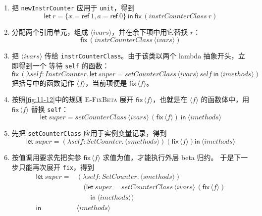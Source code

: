 \begin{enumerate}
\item 把 \texttt{newInstrCounter} 应用于 \texttt{unit}，得到
\[
\mathsf{let}\ r=\{x=\mathsf{ref}\ 1,a=\mathsf{ref}\ 0\}\
\mathsf{in}\ \mathsf{fix}\,(\mathit{instrCounterClass}\ r)
\]

\item 分配两个引用单元，组成
\(\langle\mathit{ivars}\rangle\)，并在余下项中用它替换 \(r\)：
\[
\mathsf{fix}\,(\mathit{instrCounterClass}\,
  \langle\mathit{ivars}\rangle)
\]

\item 把 \(\langle\mathit{ivars}\rangle\) 传给
\texttt{instrCounterClass}。由于该类以两个 lambda 抽象开头，立即得到一个
等待 \texttt{self} 的函数：
\[
\mathsf{fix}\,(\lambda self:\mathit{InstrCounter}.\,
  \mathsf{let}\ super=
    \mathit{setCounterClass}\,\langle\mathit{ivars}\rangle\,self\
  \mathsf{in}\ \langle\mathit{imethods}\rangle)
\]
把括号中的函数记作 \(\langle f\rangle\)，当前项便是
\(\mathsf{fix}\,\langle f\rangle\)。

\item 按照\cref{fig:11-12}中的规则 \textsc{E-FixBeta} 展开
\(\mathsf{fix}\,\langle f\rangle\)，也就是在
\(\langle f\rangle\) 的函数体中，用
\(\mathsf{fix}\,\langle f\rangle\) 替换 \texttt{self}：
\[
\mathsf{let}\ super=
  \mathit{setCounterClass}\,\langle\mathit{ivars}\rangle\,
    (\mathsf{fix}\,\langle f\rangle)\
\mathsf{in}\ \langle\mathit{imethods}\rangle
\]

\item 先把 \texttt{setCounterClass} 应用于实例变量记录，得到
\[
\mathsf{let}\ super=
  (\lambda self:\mathit{SetCounter}.\,
    \langle\mathit{smethods}\rangle)
  (\mathsf{fix}\,\langle f\rangle)
\mathsf{in}\ \langle\mathit{imethods}\rangle
\]

\item 按值调用要求先把实参
\(\mathsf{fix}\,\langle f\rangle\) 求值为值，才能执行外层 beta 归约。
于是下一步只能再次展开 \texttt{fix}，得到
\[
\begin{aligned}
\mathsf{let}\ super={}&
  (\lambda self:\mathit{SetCounter}.\,
    \langle\mathit{smethods}\rangle)\\
&\quad(\mathsf{let}\ super=
    \mathit{setCounterClass}\,\langle\mathit{ivars}\rangle\,
      (\mathsf{fix}\,\langle f\rangle)\\
&\qquad\mathsf{in}\ \langle\mathit{imethods}\rangle)\\
\mathsf{in}\ &\langle\mathit{imethods}\rangle
\end{aligned}
\]


\end{enumerate}
